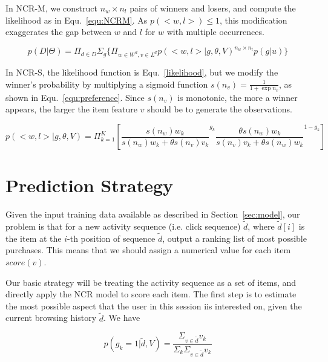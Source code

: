 \documentclass[sigconf]{acmart}
\begin{document}
In NCR-M, we construct $n_w \times n_l $ pairs of winners and losers, and compute the likelihood as in Equ.~\ref{equ:NCRM}. As $p(<w,l>) \leq 1$, this modification exaggerates the gap between $w$ and $l$ for $w$ with multiple occurrences. 

\begin{equation}\label{equ:NCRM}
		p(D|\Theta)=\Pi_{d\in D} \Sigma_{g} \{ \Pi_{w\in W^d, v\in L^d} {p(<w,l>|g,\theta,V)}^{n_w \times n_l} p(g|u) \}
\end{equation}

In NCR-S, the likelihood function is Equ.~\ref{likelihood}, but we modify the winner's probability by multiplying a sigmoid function $s(n_v)=\frac{1}{1+\exp n_v}$, as shown in Equ.~\ref{equ:preference}. Since $s(n_v)$ is monotonic, the more a winner appears, the larger the item feature $v$ should be to generate the observations. 

\begin{equation}\label{equ:peference}
 p(<w,l>|g,\theta,V)  =  \Pi_{k=1}^{K}[ {\frac{s(n_w) w_k}{s(n_w) w_k+\theta s(n_v) v_k}}^{g_k} { \frac{\theta s(n_w) w_{k}}{s(n_v) v_{k}+\theta s(n_w) w_{k}}}^{1-g_k}]
\end{equation}


\section{Prediction Strategy}\label{sec:strategy}

Given the input training data available as described in Section~\ref{sec:model}, our problem is that for a new activity sequence (i.e. click sequence) $\tilde{d}$,  where $\tilde{d}[i]$ is the item at the $i$-th position of sequence $\tilde{d}$,  output a ranking list of most possible purchases. This means that we should assign a numerical value for each item $score(v)$. 
 
Our basic strategy will be treating the activity sequence as a set of items, and directly apply the NCR model to score each item.  The first step is to estimate the most possible aspect that the user in this session iis interested on, given the current browsing history $\tilde{d}$. We have

\begin{equation}\label{aprobability}
p(g_k=1|\tilde{d},V)=\frac{\Sigma_{v\in \tilde{d}} v_k}{\Sigma_k \Sigma_{v\in \tilde{d}} v_k}
\end{equation}
\end{document}

